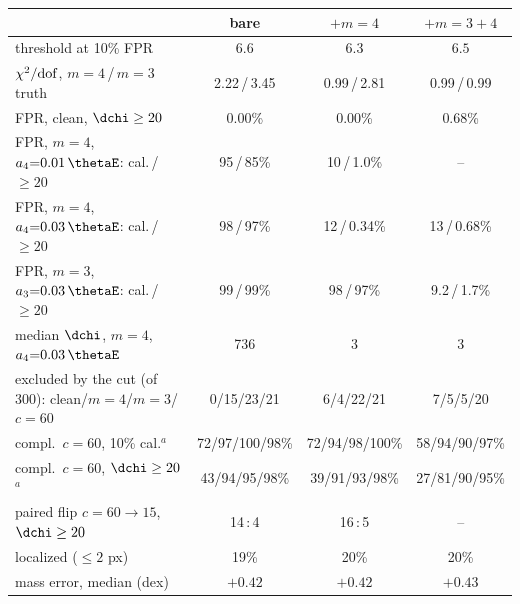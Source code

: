 \begin{tabular}{@{}lccc@{}}
\toprule
 & bare & $+m{=}4$ & $+m{=}3{+}4$ \\
\midrule
threshold at 10\% FPR & $6.6$ & $6.3$ & $6.5$ \\
$\chi^2/{\rm dof}$, $m{=}4$\,/\,$m{=}3$ truth & 2.22\,/\,3.45 & 0.99\,/\,2.81 & 0.99\,/\,0.99 \\
FPR, clean, $\dchi\ge20$ & 0.00\% & 0.00\% & 0.68\% \\
FPR, $m{=}4$, $a_4{=}0.01\,\thetaE$: cal.\,/\,${\ge}20$ & 95\,/\,85\% & 10\,/\,1.0\% & -- \\
FPR, $m{=}4$, $a_4{=}0.03\,\thetaE$: cal.\,/\,${\ge}20$ & 98\,/\,97\% & 12\,/\,0.34\% & 13\,/\,0.68\% \\
FPR, $m{=}3$, $a_3{=}0.03\,\thetaE$: cal.\,/\,${\ge}20$ & 99\,/\,99\% & 98\,/\,97\% & 9.2\,/\,1.7\% \\
median $\dchi$, $m{=}4$, $a_4{=}0.03\,\thetaE$ & 736 & 3 & 3 \\
excluded by the cut (of 300): clean/$m{=}4$/$m{=}3$/$c{=}60$ & 0/15/23/21 & 6/4/22/21 & 7/5/5/20 \\
compl.\ $c{=}60$, 10\% cal.$^{a}$ & 72/97/100/98\% & 72/94/98/100\% & 58/94/90/97\% \\
compl.\ $c{=}60$, $\dchi\ge20$$^{a}$ & 43/94/95/98\% & 39/91/93/98\% & 27/81/90/95\% \\
paired flip $c{=}60\to15$, $\dchi\ge20$ & 14\,:\,4 & 16\,:\,5 & -- \\
localized ($\le2$ px) & 19\% & 20\% & 20\% \\
mass error, median (dex) & $+0.42$ & $+0.42$ & $+0.43$ \\
\bottomrule
\end{tabular}
